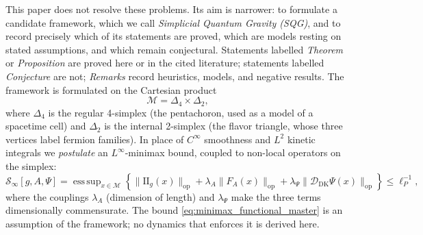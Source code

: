 \documentclass[11pt,a4paper,reqno]{amsart}
\theoremstyle{definition}
\numberwithin{equation}{section}
\newcommand{\II}{\mathrm{I\!I}}
\begin{document}
This paper does not resolve these problems. Its aim is narrower: to formulate a candidate framework, which we call \emph{Simplicial Quantum Gravity (SQG)}, and to record precisely which of its statements are proved, which are models resting on stated assumptions, and which remain conjectural. Statements labelled \emph{Theorem} or \emph{Proposition} are proved here or in the cited literature; statements labelled \emph{Conjecture} are not; \emph{Remarks} record heuristics, models, and negative results. The framework is formulated on the Cartesian product
\begin{equation}
    \label{eq:base_manifold}
    \mathcal{M} = \Delta_4 \times \Delta_2,
\end{equation}
where $\Delta_4$ is the regular 4-simplex (the pentachoron, used as a model of a spacetime cell) and $\Delta_2$ is the internal 2-simplex (the flavor triangle, whose three vertices label fermion families). In place of $C^\infty$ smoothness and $L^2$ kinetic integrals we \emph{postulate} an $L^\infty$-minimax bound, coupled to non-local operators on the simplex:
\begin{equation}
    \label{eq:minimax_functional_master}
    \mathcal{S}_\infty[g, A, \Psi] = \operatorname{ess\,sup}_{x \in \mathcal{M}} \left\{ \|\II_g(x)\|_{\mathrm{op}} + \lambda_A \|F_A(x)\|_{\mathrm{op}} + \lambda_\Psi \|\mathcal{D}_{\mathrm{DK}} \Psi(x)\|_{\mathrm{op}} \right\} \le \ell_P^{-1},
\end{equation}
where the couplings $\lambda_A$ (dimension of length) and $\lambda_\Psi$ make the three terms dimensionally commensurate. The bound \eqref{eq:minimax_functional_master} is an assumption of the framework; no dynamics that enforces it is derived here.
\end{document}
